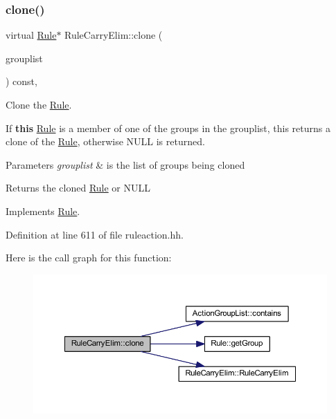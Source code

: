 \subsubsection{\texorpdfstring{clone()}{clone()}}
{\footnotesize\ttfamily virtual \mbox{\hyperlink{class_rule}{Rule}}$\ast$ Rule\+Carry\+Elim\+::clone (\begin{DoxyParamCaption}\item[{const \mbox{\hyperlink{class_action_group_list}{Action\+Group\+List}} \&}]{grouplist }\end{DoxyParamCaption}) const\hspace{0.3cm}{\ttfamily [inline]}, {\ttfamily [virtual]}}



Clone the \mbox{\hyperlink{class_rule}{Rule}}. 

If {\bfseries{this}} \mbox{\hyperlink{class_rule}{Rule}} is a member of one of the groups in the grouplist, this returns a clone of the \mbox{\hyperlink{class_rule}{Rule}}, otherwise N\+U\+LL is returned. 
\begin{DoxyParams}{Parameters}
{\em grouplist} & is the list of groups being cloned \\
\hline
\end{DoxyParams}
\begin{DoxyReturn}{Returns}
the cloned \mbox{\hyperlink{class_rule}{Rule}} or N\+U\+LL 
\end{DoxyReturn}


Implements \mbox{\hyperlink{class_rule_a70de90a76461bfa7ea0b575ce3c11e4d}{Rule}}.



Definition at line 611 of file ruleaction.\+hh.

Here is the call graph for this function\+:
\nopagebreak
\begin{figure}[H]
\begin{center}
\leavevmode
\includegraphics[width=350pt]{class_rule_carry_elim_a31e871206ad24e926b0ae9d19825ef6b_cgraph}
\end{center}
\end{figure}
\mbox{\label{class_rule_carry_elim_ac3ef2d10c9add58bf9df5a26e99c80f6}} 
